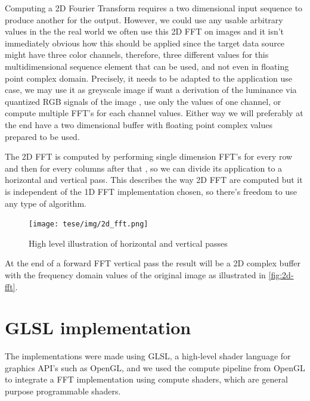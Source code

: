 \documentclass[
  oneside,
  11pt, a4paper,
  footinclude=true,
  headinclude=true,
  cleardoublepage=empty
]{scrbook}
\begin{document}
Computing a 2D Fourier Transform requires a two dimensional input sequence to produce another for the output. However, we could use any usable arbitrary values in the the real world we often use this 2D FFT on images and it isn't immediately obvious how this should be applied since the target data source might have three color channels, therefore, three different values for this multidimensional sequence element that can be used, and not even in floating point complex domain. Precisely, it needs to be adapted to the application use case, we may use it as greyscale image if want a derivation of the luminance via quantized RGB signals of the image \citep{itu2002parameter}, use only the values of one channel, or compute multiple FFT's for each channel values. Either way we will preferably at the end have a two dimensional buffer with floating point complex values prepared to be used.
\newline


The 2D FFT is computed by performing single dimension FFT's for every row and then for every columns after that \cite{dudgeon1984multidimensional}, so we can divide its application to a horizontal and vertical pass. This describes the way 2D FFT are computed but it is independent of the 1D FFT implementation chosen, so there's freedom to use any type of algorithm.


\begin{figure}[h]
    \centering
    \texttt{[image: tese/img/2d\_fft.png]}
    \caption{High level illustration of horizontal and vertical passes}
    \label{fig:2d-fft}
\end{figure}

At the end of a forward FFT vertical pass the result will be a 2D complex buffer with the frequency domain values of the original image as illustrated in \autoref{fig:2d-fft}.


\section{GLSL implementation} \label{sec:glsl-implementation}

The implementations were made using GLSL, a high-level shader language for graphics API's such as OpenGL, and we used the compute pipeline from OpenGL to integrate a FFT implementation using compute shaders, which are general purpose programmable shaders.
\end{document}
